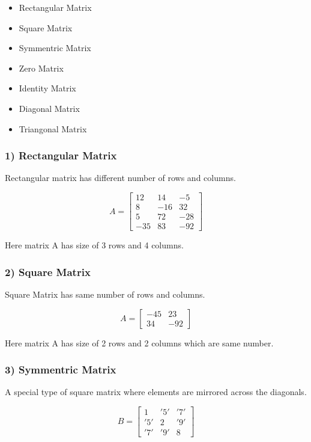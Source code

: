 \documentclass[11pt]{article}
\providecommand{\tightlist}{%
      \setlength{\itemsep}{0pt}\setlength{\parskip}{0pt}}
\begin{document}
    \begin{itemize}
\tightlist
\item
  Rectangular Matrix
\item
  Square Matrix
\item
  Symmentric Matrix
\item
  Zero Matrix
\item
  Identity Matrix
\item
  Diagonal Matrix
\item
  Triangonal Matrix
\end{itemize}

    \hypertarget{rectangular-matrix}{%
\subsubsection{1) Rectangular Matrix}\label{rectangular-matrix}}

Rectangular matrix has different number of rows and columns.

\[
A = \begin{bmatrix}
12 & 14 & -5 \\
8 & -16 & 32 \\
5 & 72 & -28 \\
-35 & 83 & -92
\end{bmatrix}
\]

Here matrix A has size of 3 rows and 4 columns.

\hypertarget{square-matrix}{%
\subsubsection{2) Square Matrix}\label{square-matrix}}

Square Matrix has same number of rows and columns.

\[
A = \begin{bmatrix}
-45 & 23 \\
34 & -92 
\end{bmatrix}
\]

Here matrix A has size of 2 rows and 2 columns which are same number.

\hypertarget{symmentric-matrix}{%
\subsubsection{3) Symmentric Matrix}\label{symmentric-matrix}}

A special type of square matrix where elements are mirrored across the
diagonals.

\[
B = \begin{bmatrix}
1 & '5' & '7' \\
'5' & 2 & '9' \\
'7' & '9' & 8
\end{bmatrix}
\]
\end{document}
